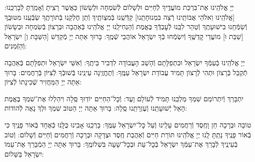 \documentclass[twoside, openany, parskip=half, 11pt]{book}
\begin{document}
יְיָ אֱלֹהֵֽינוּ אֶת־בִּרְכַּת מוֹעֲדֶֽיךָ לְֿחַיִּים וּלְשָׁלוֹם לְֿשִׂמְחָה וּלְשָׂשׂוֹן כַּאֲשֶׁר רָצִֽיתָ וְֿאָמַֽרְתָּ לְֿבָרְכֵֽנוּ: [\shabbos אֱלֹהֵֽינוּ וֵאלֹהֵי אֲבוֹתֵֽינוּ רְֿצֵה בִמְנוּחָתֵֽנוּ] קַדְּֿשֵֽׁנוּ בְּֿמִצְוֹתֶֽיךָ וְֿתֵן חֶלְקֵֽנוּ בְּֿתוֹרָתֶֽךָ שַׂבְּֿעֵֽנוּ מִטּוּבֶֽךָ וְֿשַׂמְּֿחֵֽנוּ בִּישׁוּעָתֶֽךָ וְֿטַהֵר לִבֵּֽנוּ לְֿעׇבְדְּֿךָ בֶּאֱמֶת וְֿהַנְחִילֵֽנוּ יְיָ אֱלֹהֵֽינוּ בְּֿאַהֲבָה וּבְרָצוֹן בְּֿשִׂמְחָה וּבְשָׂשׂוֹן [\shabbos שַׁבַּת וּ] מוֹעֲדֵי קׇדְשֶֽׁךָ וְֿיִשְׂמְֿחוּ בְֿךָ יִשְׂרָאֵל אוֹהֲבֵי שְֿׁמֶֽךָ: בָּרוּךְ אַתָּה יְיָ מְֿקַדֵּשׁ
[\shabbos הַשַּׁבָּת וְ] יִשְׂרָאֵל וְֿהַזְּֿמַנִּים:


יְיָ אֱלֹהֵֽינוּ בְּֿעַמְּֿךָ יִשְׂרָאֵל וּבִתְפִלָּתָם וְֿהָשֵׁב הָעֲבוֹדָה לִדְבִיר בֵּיתֶֽךָ: וְֿאִשֵּׁי יִשְׂרָאֵל וּתְפִלָּתָם בְּֿאַהֲבָה תְֿקַבֵּל בְּֿרָצוֹן וּתְהִי לְֿרָצוֹן תָּמִיד עֲבוֹדַת יִשְׂרָאֵל עַמֶּֽךָ: וְֿתֶחֱזֶֽינָה עֵינֵֽינוּ בְּֿשׁוּבְֿךָ לְֿצִיּוֹן בְּֿרַחֲמִים: בָּרוּךְ אַתָּה יְיָ הַמַּחֲזִיר שְֿׁכִינָתוֹ לְֿצִיּוֹן:

\modim

יִתְבָּרַךְ וְֿיִתְרוֹמַם שִׁמְךָ מַלְכֵּֽנוּ תָּמִיד לְֿעוֹלָם וָעֶד: וְֿכׇל־הַחַיִּים יוֹדֽוּךָ סֶּֽלָה וִיהַלְלוּ אֶת־שִׁמְךָ בֶּאֱמֶת הָאֵל יְֿשׁוּעָתֵֽנוּ וְֿעֶזְרָתֵֽנוּ סֶֽלָה: בָּרוּךְ אַתָּה יְיָ הַטּוֹב שִׁמְךָ וּלְךָ נָאֶה לְֿהוֹדוֹת:



טוֹבָה וּבְרָכָה חֵן וָחֶֽסֶד וְֿרַחֲמִים עָלֵֽינוּ וְֿעַל כׇּל־יִשְׂרָאֵל עַמֶּֽךָ: בָּרְכֵֽנוּ אָבִֽינוּ כֻּלָּֽנוּ כְּֿאֶחָד בְּֿאוֹר פָּנֶֽיךָ כִּי בְֿאוֹר פָּנֶֽיךָ נָתַֽתָּ לָֽנוּ יְיָ אֱלֹהֵֽינוּ תּוֹרַת חַיִּים וְֿאַהֲבַת חֶֽסֶד וּצְדָקָה וּבְרָכָה וְֿרַחֲמִים וְֿחַיִּים וְֿשָׁלוֹם: וְֿטוֹב בְּֿעֵינֶֽיךָ לְֿבָרֵךְ אֶת־עַמְּֿךָ יִשְׂרָאֵל בְּֿכׇל־עֵת וּבְכׇל־שָׁעָה בִּשְׁלוֹמֶֽךָ: בָּרוּךְ אַתָּה יְיָ הַמְֿבָרֵךְ אֶת־עַמּוֹ יִשְׂרָאֵל בַּשָּׁלוֹם:

\tachanunim

\vfill


\\

\sepline

\\
\\
\end{document}

